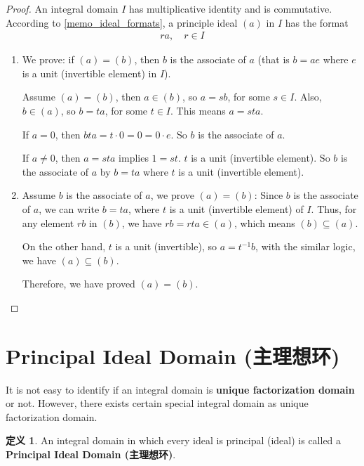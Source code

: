 \documentclass[utf8]{ctexbook}
\theoremstyle{definition}
\newtheorem{protodefinition}{定义}[section]
\newenvironment{definition}
   {\colorlet{shadecolor}{black!15}\begin{shaded}\begin{protodefinition}}
   {\end{protodefinition}\end{shaded}}
\begin{document}
\begin{proof}
An integral domain $I$ has multiplicative identity and is commutative. According to \ref{memo_ideal_formats}, a principle ideal $(a)$ in $I$ has the format
\begin{align*}
r a, \quad r \in I
\end{align*}

\begin{enumerate}
\item{We prove: if $(a) = (b)$, then $b$ is the associate of $a$  (that is $b= a e$ where $e$ is a unit (invertible element) in $I$).

Assume $(a) = (b)$, then $a \in (b)$, so $a = s b $, for some $s \in I $. Also, $b \in (a)$, so $b = t a$, for some $t \in I$. This means $a = s t a$. 

If $a=0$, then $b  t a = t \cdot 0 = 0 = 0 \cdot e$. So $b$ is the associate of $a$.

If $a \neq 0$, then $a = s t a $ implies $1 = s t $. $t$ is a unit (invertible element). So $b$ is the associate of $a$ by $b = t a $ where $t$ is a unit (invertible element).
}
\item{Assume $b$ is the associate of $a$, we prove $(a) = (b)$: Since $b$ is the associate of $a$, we can write $b = t a$, where $t$ is a unit (invertible element) of $I$. Thus, for any element $ rb $ in $(b)$, we have $rb = r t a \in (a) $, which means $(b) \subseteq (a)$.

On the other hand, $t$ is a unit (invertible), so $a = t^{-1} b$, with the similar logic, we have $(a) \subseteq (b)$.

Therefore, we have proved $(a) = (b)$.
}
\end{enumerate}

\end{proof}

\section{Principal Ideal Domain (主理想环)}

It is not easy to identify if an integral domain is \textbf{unique factorization domain} or not. However, there exists certain special integral domain as unique factorization domain.

\begin{definition}
An integral domain in which every ideal is principal (ideal) is called a \textbf{Principal Ideal Domain (主理想环)}.
\end{definition}
\end{document}

